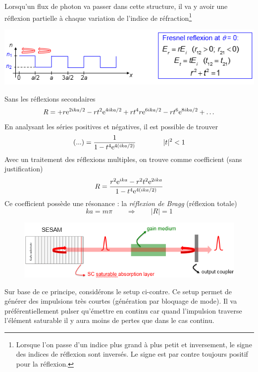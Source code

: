	Lorsqu'un flux de photon va passer dans cette structure, il va y avoir une réflexion partielle
	à chaque variation de l'indice de réfraction\footnote{Lorsque l'on passe d'un indice plus grand à
	plus petit et inversement, le signe des indices de réflexion sont inversés. Le signe est par
	contre toujours positif pour la réflexion.}

	\begin{center}
	\includegraphics[scale=0.8]{ch5/image24}
	\end{center}
	Sans les réflexions secondaires
	\begin{equation}
	R =  + r{{\rm{e}}^{2ika/2}} - r{t^2}{{\rm{e}}^{4ika/2}} + r{t^4}r{{\rm{e}}^{6ika/2}} - r{t^6}
	{{\rm{e}}^{8ika/2}} + \dots
	\end{equation}		
	En analysant les séries positives et négatives, il est possible de trouver
	\begin{equation}
	(...) = \frac{1}{{1 - {t^4}{{\rm{e}}^{4(ika/2)}}}}\qquad\qquad |t|^2<1
	\end{equation}		
	Avec un traitement des réflexions multiples, on trouve comme coefficient (sans justification)
	\begin{equation}
	R = \frac{{{r^2}{{\rm{e}}^{ika}} - {r^2}{t^2}{{\rm{e}}^{2ika}}}}{{1 - {t^4}{{\rm{e}}^{4(ika/2)}}}}
	\end{equation}
	Ce coefficient possède une résonance : la \textit{réflexion de Bragg} (réflexion totale)
	\begin{equation}
	ka = m\pi\qquad\Rightarrow\qquad |R|=1
	\end{equation}
	

	\begin{figure}
	\vspace{-5mm}
	\includegraphics[scale=0.6]{ch5/image25}
	\end{figure}
	Sur base de ce principe, considérons le setup ci-contre.
	Ce setup permet de générer des impulsions très courtes (génération par bloquage de mode). Il va 
	préférentiellement pulser qu'émettre en continu car quand l'impulsion traverse l'élément saturable 
	il y aura moins de pertes que dans le cas continu.
	

